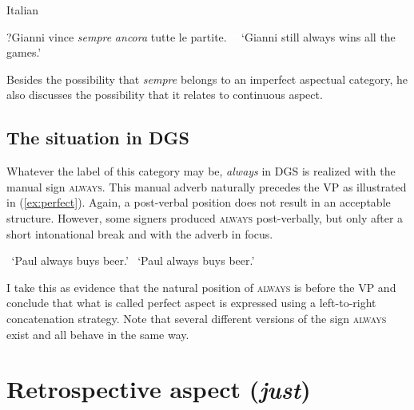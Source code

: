 \begin{exe}
\ex Italian \citep[96]{cinque1999adverbs}\begin{xlist} 
\ex *?{{Gianni vince \textit{sempre} \textit{ancora} tutte le partite.}
\glt \textcolor{white}{*?}`Gianni still always wins all the games.' \label{ex:perfectbb}}
\end{xlist}
\end{exe} 

\noindent Besides the possibility that \textit{sempre} belongs to an imperfect aspectual category, he also discusses the possibility that it relates to continuous aspect. 

\subsection{The situation in DGS}
Whatever the label of this category may be, \textit{always} in DGS is realized with the manual sign \textsc{always}. This manual adverb naturally precedes the VP as illustrated in (\ref{ex:perfect}). Again, a post-verbal position does not result in an acceptable structure. However, some signers produced \textsc{always} post-verbally, but only after a short intonational break and with the adverb in focus.  

\begin{exe}
\ex\label{alwaysbeerbuy}\begin{xlist}
\glt \textcolor{white}{?}`Paul always buys beer.' \label{ex:perfect}
\glt \textcolor{white}{?}`Paul always buys beer.' \label{ex:perfectb}
\end{xlist}
\end{exe} 

\noindent I take this as evidence that the natural position of \textsc{always} is before the VP and conclude that what is called perfect aspect is expressed using a left-to-right concatenation strategy. Note that several different versions of the sign \textsc{always} exist and all behave in the same way.






\section{Retrospective aspect (\textit{just})}\label{justjust}
